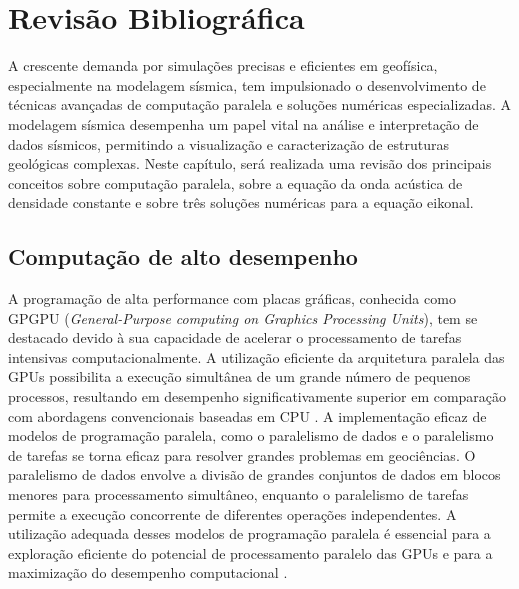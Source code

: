 \chapter{Revisão Bibliográfica}
\label{ch:revisaobibliografica}

A crescente demanda por simulações precisas e eficientes em geofísica, especialmente na modelagem sísmica, tem impulsionado o desenvolvimento de técnicas avançadas de computação paralela e soluções numéricas especializadas. A modelagem sísmica desempenha um papel vital na análise e interpretação de dados sísmicos, permitindo a visualização e caracterização de estruturas geológicas complexas. Neste capítulo, será realizada uma revisão dos principais conceitos sobre computação paralela, sobre a equação da onda acústica de densidade constante e sobre três soluções numéricas para a equação eikonal. 

\section{Computação de alto desempenho}

A programação de alta performance com placas gráficas, conhecida como GPGPU (\textit{General-Purpose computing on Graphics Processing Units}), tem se destacado devido à sua capacidade de acelerar o processamento de tarefas intensivas computacionalmente. A utilização eficiente da arquitetura paralela das GPUs possibilita a execução simultânea de um grande número de pequenos processos, resultando em desempenho significativamente superior em comparação com abordagens convencionais baseadas em CPU \cite{luebke2008cuda}. A implementação eficaz de modelos de programação paralela, como o paralelismo de dados e o paralelismo de tarefas se torna eficaz para resolver grandes problemas em geociências. O paralelismo de dados envolve a divisão de grandes conjuntos de dados em blocos menores para processamento simultâneo, enquanto o paralelismo de tarefas permite a execução concorrente de diferentes operações independentes. A utilização adequada desses modelos de programação paralela é essencial para a exploração eficiente do potencial de processamento paralelo das GPUs e para a maximização do desempenho computacional  \cite{sterling2017high}.

